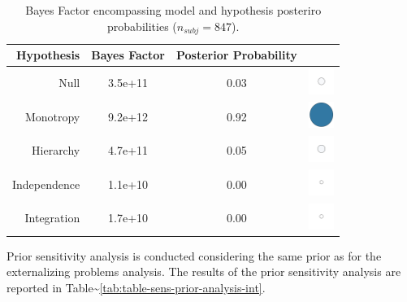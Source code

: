\documentclass[
]{book}
\begin{document}
\begin{table}[!h]

\caption{\label{tab:table-bf-results-int}Bayes Factor encompassing model and hypothesis posteriro probabilities  ($n_{subj} = 847$).}
\centering
\begin{tabular}[t]{rcc>{\centering\arraybackslash}m{1cm}}
\toprule
\textbf{Hypothesis} & \textbf{Bayes Factor} & \textbf{Posterior Probability} & \textbf{ }\\
\midrule
Null & 3.5e+11 & 0.03 & \includegraphics[width=0.33in, height=0.33in]{images/ball_BF_int_null.png}\\
Monotropy & 9.2e+12 & 0.92 & \includegraphics[width=0.33in, height=0.33in]{images/ball_BF_int_monotropy.png}\\
Hierarchy & 4.7e+11 & 0.05 & \includegraphics[width=0.33in, height=0.33in]{images/ball_BF_int_hierarchy.png}\\
Independence & 1.1e+10 & 0.00 & \includegraphics[width=0.33in, height=0.33in]{images/ball_BF_int_independence.png}\\
Integration & 1.7e+10 & 0.00 & \includegraphics[width=0.33in, height=0.33in]{images/ball_BF_int_integration.png}\\
\bottomrule
\end{tabular}
\end{table}

Prior sensitivity analysis is conducted considering the same prior as for the externalizing problems analysis. The results of the prior sensitivity analysis are reported in Table\textasciitilde\ref{tab:table-sens-prior-analysis-int}.
\end{document}
